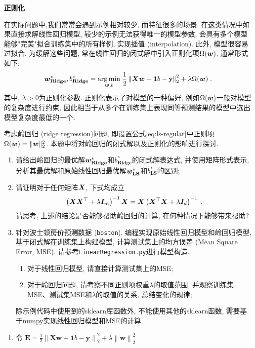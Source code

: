 \documentclass[answers]{exam}  %
\begin{document}
\begin{questions}
  \question [25] \textbf{正则化}

  在实际问题中,我们常常会遇到示例相对较少, 而特征很多的场景. 在这类情况中如果直接求解线性回归模型, 较少的示例无法获得唯一的模型参数, 会具有多个模型能够"完美"拟合训练集中的所有样例, 实现插值 (interpolation). 此外, 模型很容易过拟合. 为缓解这些问题, 常在线性回归的闭式解中引入正则化项$\Omega(\boldsymbol{w})$, 通常形式如下:
  \begin{equation}
    \boldsymbol{w}_{\mathbf{Ridge}}^{*}, b_{\mathbf{Ridge}}^{*}=\underset{\boldsymbol{w}, b}{\arg \min }\; \frac{1}{2}\left\|\boldsymbol{X} \boldsymbol{w}+\boldsymbol{1} b-\mathbf{y}\right\|_{2}^{2}+\lambda \Omega(\boldsymbol{w})  \label{eq:ls-regular}\;.
  \end{equation}
  其中, $\lambda > 0$为正则化参数. 正则化表示了对模型的一种偏好, 例如$\Omega(\boldsymbol{w})$一般对模型的复杂度进行约束, 因此相当于从多个在训练集上表现同等预测结果的模型中选出模型复杂度最低的一个.

  考虑岭回归 (ridge regression)问题, 即设置公式\eqref{eq:ls-regular}中正则项$\Omega(\boldsymbol{w}) = \lVert \boldsymbol{w}\rVert_2^2$. 本题中将对岭回归的闭式解以及正则化的影响进行探讨.
  \begin{enumerate}
    \item 请给出岭回归的最优解$\boldsymbol{w}_{\mathbf{Ridge}}^*$和$b_{\mathbf{Ridge}}^*$的闭式解表达式, 并使用矩阵形式表示, 分析其最优解和原始线性回归最优解$\boldsymbol{w}_{\mathbf{LS}}^*$和$b_{\mathbf{LS}}^*$的区别;
    \item 请证明对于任何矩阵$\boldsymbol{X}$, 下式均成立
          \begin{align}
            \left(\boldsymbol{X} \boldsymbol{X}^{\top}+\lambda \boldsymbol{I}_m\right)^{-1} \boldsymbol{X}=\boldsymbol{X}\left(\boldsymbol{X}^{\top} \boldsymbol{X}+\lambda \boldsymbol{I}_d\right)^{-1}\;.
          \end{align}
          请思考, 上述的结论是否能够帮助岭回归的计算, 在何种情况下能够带来帮助?
    \item 针对波士顿房价预测数据 (\lstinline{boston}), 编程实现原始线性回归模型和岭回归模型, 基于闭式解在训练集上构建模型, 计算测试集上的均方误差 (Mean Square Error, MSE). 请参考\lstinline{LinearRegression.py}进行模型构造.
          
          \begin{enumerate}
            \item 对于线性回归模型, 请直接计算测试集上的MSE;
            \item 对于岭回归问题, 请考察不同正则项权重$\lambda$的取值范围, 并观察训练集MSE、测试集MSE和$\lambda$的取值的关系, 总结变化的规律;
          \end{enumerate} 除示例代码中使用到的sklearn库函数外, 不能使用其他的sklearn函数, 需要基于numpy实现线性回归模型和MSE的计算.
  \end{enumerate}
  \begin{solution}
    \begin{enumerate}
      \item 令 $\displaystyle \bm{E} = \frac{1}{2}\left\| \bm{X}\bm{w}+\bm{1}b-\bm{y} \right\|_{2}^{2} + \lambda\left\| \bm{w} \right\|_{2}^{2}$


\end{enumerate}
\end{solution}
\end{questions}
\end{document}
